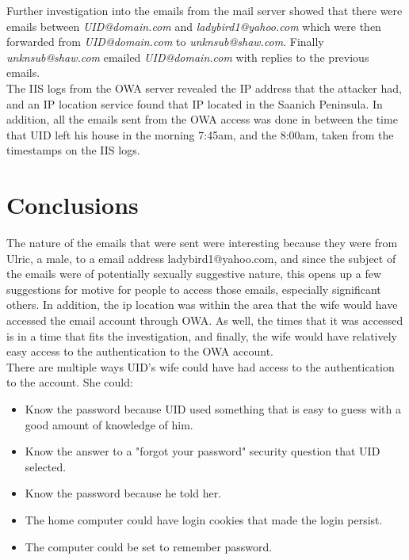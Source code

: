 \documentclass{article}
\numberwithin{equation}{section} %
\numberwithin{figure}{section} %
\numberwithin{table}{section} %
\begin{document}
Further investigation into the emails from the mail server showed that there were emails between \textit{UID@domain.com} and \textit{ladybird1@yahoo.com} which were then forwarded from \textit{UID@domain.com} to \textit{unknsub@shaw.com}.  Finally \textit{unknsub@shaw.com} emailed \textit{UID@domain.com} with replies to the previous emails. \\

The IIS logs from the OWA server revealed the IP address that the attacker had, and an IP location service found that IP located in the Saanich Peninsula.  In addition, all the emails sent from the OWA access was done in between the time that UID left his house in the morning 7:45am, and the 8:00am, taken from the timestamps on the IIS logs. \\

\section{Conclusions}
The nature of the emails that were sent were interesting because they were from Ulric, a male, to a email address ladybird1@yahoo.com, and since the subject of the emails were of potentially sexually suggestive nature, this opens up a few suggestions for motive for people to access those emails, especially significant others.  In addition, the ip location was within the area that the wife would have accessed the email account through OWA.  As well, the times that it was accessed is in a time that fits the investigation, and finally, the wife would have relatively easy access to the authentication to the OWA account.\\ 

There are multiple ways UID's wife could have had access to the authentication to the account.  She could: 

\begin{itemize}
	\item Know the password because UID used something that is easy to guess with a good amount of knowledge of him.
	\item Know the answer to a "forgot your password" security question that UID selected.
	\item Know the password because he told her.  
	\item The home computer could have login cookies that made the login persist.
	\item The computer could be set to remember password. 
\end{itemize}
\end{document}
